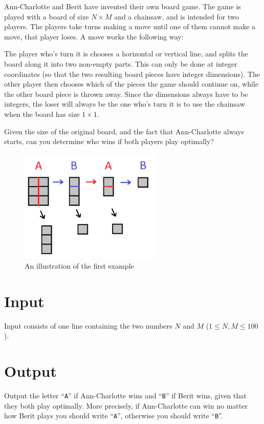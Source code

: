 Ann-Charlotte and Berit have invented their own board game.
The game is played with a board of size $N \times M$ and a chainsaw, and is intended for two players.
The players take turns making a move until one of them cannot make a move, that player loses.
A move works the following way:

The player who's turn it is chooses a horizontal or vertical line, and splits the board along it into two non-empty parts.
This can only be done at integer coordinates (so that the two resulting board pieces have integer dimensions).
The other player then chooses which of the pieces the game should continue on, while the other board piece is thrown away.
Since the dimensions always have to be integers, the loser will always be the one who's turn it is to use the chainsaw when the board has size $1 \times 1$.

Given the size of the original board, and the fact that Ann-Charlotte always starts, can you determine who wins if both players play optimally?

\begin{figure}[ht!]
\centering
\includegraphics[width=0.6\textwidth]{bradspelet.png}
\caption{An illustration of the first example}
\label{overflow}
\end{figure}

\section*{Input}
Input consists of one line containing the two numbers $N$ and $M$ ($1 \le N,M \le 100$).

\section*{Output}
Output the letter ``\texttt{A}'' if Ann-Charlotte wins and ``\texttt{B}'' if
Berit wins, given that they both play optimally. More precisely, if Ann-Charlotte
can win no matter how Berit plays you should write ``\texttt{A}'', otherwise you
should write ``\texttt{B}''.

